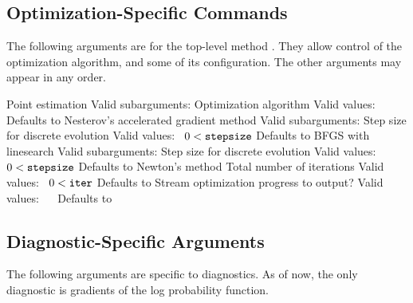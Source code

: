 \subsection{Optimization-Specific Commands}

The following arguments are for the top-level method .
They allow control of the optimization algorithm, and some of its
configuration.  The other arguments may appear in any order.

\begin{description}
%
    {Point estimation}
    {Valid subarguments: }
%
      {Optimization algorithm}
      {Valid values: \  }
      {Defaults to }
%
        {Nesterov's accelerated gradient method}
        {Valid subarguments: }
%
          {Step size for discrete evolution}
          {Valid values: \  $0 < \mbox{{\tt stepsize}}$}
          {Defaults to }
%
        {BFGS with linesearch}
        {Valid subarguments: }
%
          {Step size for discrete evolution}
          {Valid values: \  $0 < \mbox{{\tt stepsize}}$}
          {Defaults to }
%
        {Newton's method}
%
      {Total number of iterations}
      {Valid values: \  $0 < \mbox{{\tt iter}}$}
      {Defaults to }
%
      {Stream optimization progress to output?}
      {Valid values: \  \ }
      {Defaults to }
%
\end{description}

\subsection{Diagnostic-Specific Arguments}

The following arguments are specific to diagnostics.  As of now, the
only diagnostic is gradients of the log probability function.

